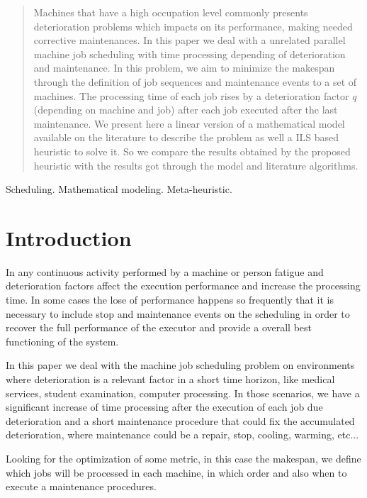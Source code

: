 \documentclass[a4paper,11pt]{article}
\begin{document}
\begin{abstract}
Machines that have a high occupation level commonly presents deterioration problems which impacts on its performance, making needed corrective maintenances. In this paper we deal with a unrelated parallel machine job scheduling with time processing depending of deterioration and maintenance. In this problem, we aim to minimize the makespan through the definition of job sequences and maintenance events to a set of machines. The processing time of each job rises by a deterioration factor $q$ (depending on machine and job) after each job executed after the last maintenance. We present here a linear version of a mathematical model available on the literature to describe the problem as well a ILS based heuristic to solve it. So we compare the results obtained by the proposed heuristic with the results got through the model and literature algorithms. 
\end{abstract}

\bigskip
\begin{keywords}
Scheduling. Mathematical modeling. Meta-heuristic.

\bigskip
{}
\end{keywords}

 
\newpage
\section{Introduction} 
 
 In any continuous activity performed by a machine or person fatigue and deterioration factors affect the execution performance and increase the processing time. In some cases the lose of performance happens so frequently that it is necessary to include stop and maintenance events on the scheduling in order to recover the full performance of the executor and provide a overall best functioning of the system. 
 
 In this paper we deal with the machine job scheduling problem on environments where deterioration is a relevant factor in a short time horizon, like medical services, student examination, computer processing. In those scenarios, we have a significant increase of time processing after the execution of each job due deterioration and a short maintenance procedure that could fix the accumulated deterioration, where maintenance could be a repair, stop, cooling, warming, etc...
 
 Looking for the optimization of some metric, in this case the makespan, we define which jobs will be processed in each machine, in which order and also when to execute a maintenance procedures. 
 
\end{document}
